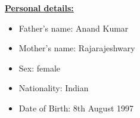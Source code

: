 \documentclass[10pt]{article}
\begin{document}
\underline{\textbf{\Large{Personal details:}}}
\begin{itemize}
	\item{Father's name: Anand Kumar}
	\item{Mother's name: Rajarajeshwary}
	\item{Sex: female} 
	\item{Nationality: Indian} 
	\item{Date of Birth: 8th August 1997} 
\end{itemize}
\hfill
\end{document}
